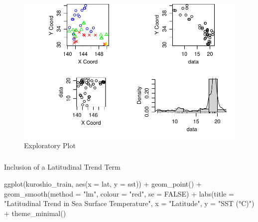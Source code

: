 \documentclass[
  11pt,
]{article}
\makeatletter
\let\oldsubparagraph\subparagraph
\renewcommand{\subparagraph}{
    \@ifstar
      \xxxSubParagraphStar
      \xxxSubParagraphNoStar
  }
\newcommand{\xxxSubParagraphStar}[1]{\oldsubparagraph*{#1}\mbox{}}
\newcommand{\xxxSubParagraphNoStar}[1]{\oldsubparagraph{#1}\mbox{}}
\newenvironment{Shaded}{\begin{snugshade}}{\end{snugshade}}
\newcommand{\AttributeTok}[1]{\textcolor[rgb]{0.40,0.45,0.13}{#1}}
\newcommand{\ConstantTok}[1]{\textcolor[rgb]{0.56,0.35,0.01}{#1}}
\newcommand{\FunctionTok}[1]{\textcolor[rgb]{0.28,0.35,0.67}{#1}}
\newcommand{\NormalTok}[1]{\textcolor[rgb]{0.00,0.23,0.31}{#1}}
\newcommand{\SpecialCharTok}[1]{\textcolor[rgb]{0.37,0.37,0.37}{#1}}
\newcommand{\StringTok}[1]{\textcolor[rgb]{0.13,0.47,0.30}{#1}}
\makeatother
\begin{document}
\begin{figure}[H]

{\centering \includegraphics{project_files/figure-pdf/unnamed-chunk-6-1.pdf}

}

\caption{Exploratory Plot}

\end{figure}%

\subparagraph{Inclusion of a Latitudinal Trend
Term}\label{inclusion-of-a-latitudinal-trend-term}

\begin{Shaded}
\begin{Highlighting}[]
\FunctionTok{ggplot}\NormalTok{(kuroshio\_train, }\FunctionTok{aes}\NormalTok{(}\AttributeTok{x =}\NormalTok{ lat, }\AttributeTok{y =}\NormalTok{ sst)) }\SpecialCharTok{+}   
  \FunctionTok{geom\_point}\NormalTok{() }\SpecialCharTok{+}   \FunctionTok{geom\_smooth}\NormalTok{(}\AttributeTok{method =} \StringTok{"lm"}\NormalTok{, }\AttributeTok{colour =} \StringTok{"red"}\NormalTok{, }\AttributeTok{se =} \ConstantTok{FALSE}\NormalTok{) }\SpecialCharTok{+}   
  \FunctionTok{labs}\NormalTok{(}\AttributeTok{title =} \StringTok{"Latitudinal Trend in Sea Surface Temperature"}\NormalTok{,        }
  \AttributeTok{x =} \StringTok{"Latitude"}\NormalTok{, }\AttributeTok{y =} \StringTok{"SST (°C)"}\NormalTok{) }\SpecialCharTok{+}   
  \FunctionTok{theme\_minimal}\NormalTok{()}
\end{Highlighting}
\end{Shaded}
\end{document}
